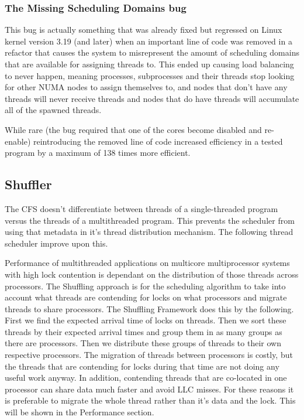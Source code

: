 \documentclass{sig-alternate}
\begin{document}
\subsubsection{The Missing Scheduling Domains bug}
\label{sec:cfsfault_missingsched}

This bug is actually something that was already fixed but regressed on Linux kernel version 3.19 (and later) when an important line of code was removed in a refactor that causes the system to misrepresent the amount of scheduling domains that are available for assigning threads to. This ended up causing load balancing to never happen, meaning processes, subprocesses and their threads stop looking for other NUMA nodes to assign themselves to, and nodes that don't have any threads will never receive threads and nodes that do have threads will accumulate all of the spawned threads.

While rare (the bug required that one of the cores become disabled and re-enable) reintroducing the removed line of code increased efficiency in a tested program by a maximum of 138 times more efficient.~\cite{Lozi:2016}

\subsection{Shuffler}
\label{sec:shuffler}

The CFS doesn't differentiate between threads of a single-threaded program versus the threads of a multithreaded program. This prevents the scheduler from using that metadata in it's thread distribution mechanism. The following thread scheduler improve upon this.

Performance of multithreaded applications on multicore multiprocessor systems with high lock contention is dependant on the distribution of those threads across processors. The Shuffling approach is for the scheduling algorithm to take into account what threads are contending for locks on what processors and migrate threads to share processors. The Shuffling Framework does this by the following. First we find the expected arrival time of locks on threads. Then we sort these threads by their expected arrival times and group them in as many groups as there are processors. Then we distribute these groups of threads to their own respective processors. The migration of threads between processors is costly, but the threads that are contending for locks during that time are not doing any useful work anyway. In addition, contending threads that are co-located in one processor can share data much faster and avoid LLC misses. For these reasons it is preferable to migrate the whole thread rather than it's data and the lock. This will be shown in the Performance section.~\cite{KumarEtal:2014}
\end{document}
